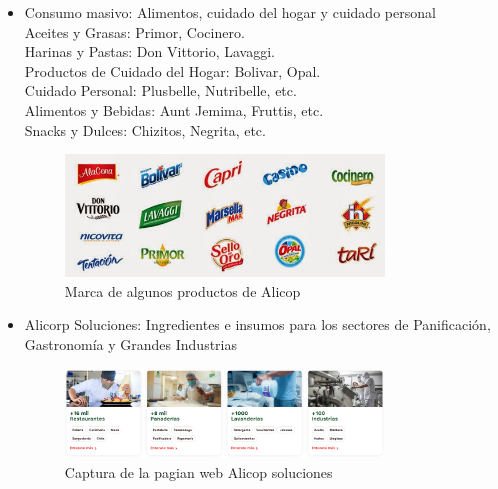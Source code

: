 \begin{itemize}
\item Consumo masivo: Alimentos, cuidado del hogar y cuidado personal
\\Aceites y Grasas: Primor, Cocinero. 
\\Harinas y Pastas: Don Vittorio, Lavaggi. 
\\Productos de Cuidado del Hogar: Bolivar, Opal. 
\\Cuidado Personal: Plusbelle, Nutribelle, etc. 
\\Alimentos y Bebidas: Aunt Jemima, Fruttis, etc. 
\\Snacks y Dulces: Chizitos, Negrita, etc. 

\begin{figure}[!ht]
    \centering
    \includegraphics[width=0.8\textwidth]{./figuras/productos_marcas.jpg}
    \caption{Marca de algunos productos de Alicop}
    \label{fig:Marcas}
\end{figure}


\item Alicorp Soluciones: Ingredientes e insumos para los sectores de Panificación, Gastronomía y Grandes Industrias\\

\begin{figure}[!ht]
    \centering
    \includegraphics[width=0.8\textwidth]{./figuras/productos_alicorp_soluciones.png}
    \caption{Captura de la pagian web Alicop soluciones}
    \label{fig:alicorp_soluciones}
\end{figure}


\end{itemize}
